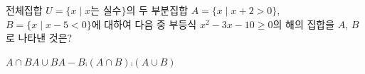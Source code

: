 전체집합 $U=\{x \mid x$는 실수$\}$의 두 부분집합 $A=\{x \mid x+2>0\}$, $B=\{x \mid x-5<0\}$에 대하여 다음 중 부등식 $x^2-3x-10\ge 0$의 해의 집합을 $A$, $B$로 나타낸 것은?
\begin{choices32}{$A\cap B$}{$A\cup B$}{$A-B$}{$\comp{(A\cap B)}$}{$\comp{(A\cup B)}$}\end{choices32}
